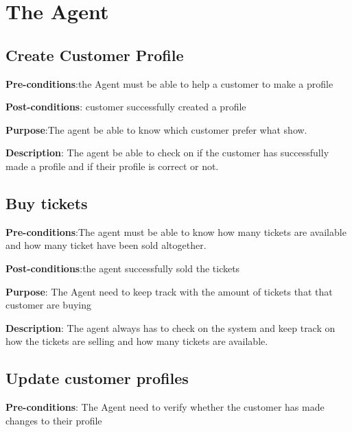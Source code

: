 \section{The Agent}

%
%

\subsection{Create Customer Profile}
\textbf{Pre-conditions}:the Agent must be able to help a customer to make a profile

\textbf{Post-conditions}: customer successfully created a profile

\textbf{Purpose}:The agent be able to know which customer prefer what show.

\textbf{Description}: The agent be able to check on if the customer has successfully made a profile and if their profile is correct or not.

\subsection{Buy tickets}
\textbf{Pre-conditions}:The agent must be able to know how many tickets are available and how many ticket have been sold altogether.

\textbf{Post-conditions}:the agent successfully sold the tickets

\textbf{Purpose}: The Agent need to keep track with the amount of tickets that that customer are buying

\textbf{Description}: The agent always has to check on the system and keep track on how the tickets are selling and how many tickets are available.

\subsection{Update customer profiles}
\textbf{Pre-conditions}: The Agent need to verify whether the customer has made changes to their profile

